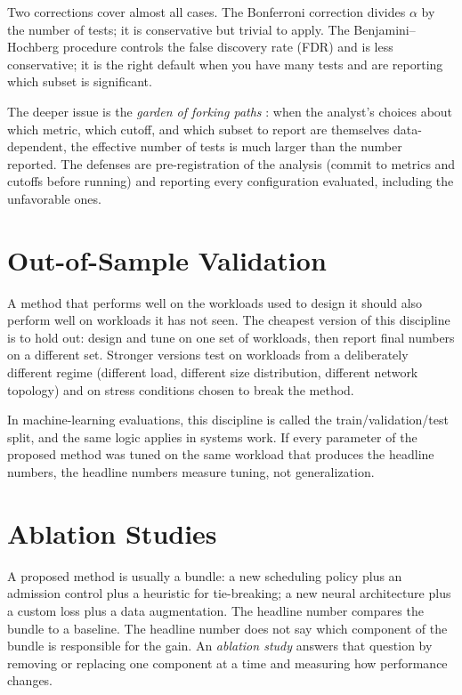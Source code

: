 \documentclass[11pt]{article}
\begin{document}
Two corrections cover almost all cases. The Bonferroni correction divides $\alpha$ by the number of tests; it is conservative but trivial to apply. The Benjamini--Hochberg procedure \citep{benjamini1995controlling} controls the false discovery rate (FDR) and is less conservative; it is the right default when you have many tests and are reporting which subset is significant.

The deeper issue is the \emph{garden of forking paths} \citep{gelman2013garden}: when the analyst's choices about which metric, which cutoff, and which subset to report are themselves data-dependent, the effective number of tests is much larger than the number reported. The defenses are pre-registration of the analysis (commit to metrics and cutoffs before running) and reporting every configuration evaluated, including the unfavorable ones.

\section{Out-of-Sample Validation}
\label{sec:out-of-sample}

A method that performs well on the workloads used to design it should also perform well on workloads it has not seen. The cheapest version of this discipline is to hold out: design and tune on one set of workloads, then report final numbers on a different set. Stronger versions test on workloads from a deliberately different regime (different load, different size distribution, different network topology) and on stress conditions chosen to break the method.

In machine-learning evaluations, this discipline is called the train/validation/test split, and the same logic applies in systems work. If every parameter of the proposed method was tuned on the same workload that produces the headline numbers, the headline numbers measure tuning, not generalization.

\section{Ablation Studies}
\label{sec:ablation}

A proposed method is usually a bundle: a new scheduling policy plus an admission control plus a heuristic for tie-breaking; a new neural architecture plus a custom loss plus a data augmentation. The headline number compares the bundle to a baseline. The headline number does not say which component of the bundle is responsible for the gain. An \emph{ablation study} answers that question by removing or replacing one component at a time and measuring how performance changes.
\end{document}
